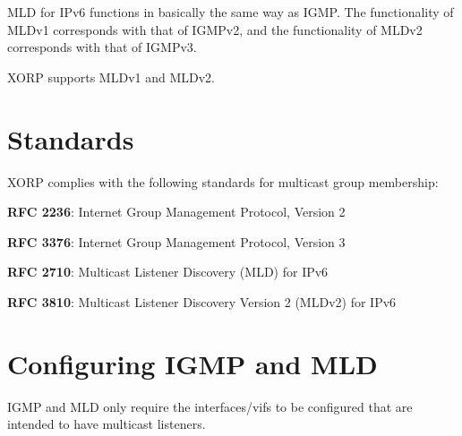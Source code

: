 MLD for IPv6 functions in basically the same way as IGMP.  The
functionality of MLDv1 corresponds with that of IGMPv2, and the
functionality of MLDv2 corresponds with that of IGMPv3.  

XORP supports MLDv1 and MLDv2.

\vfill\eject
\section{Standards}
XORP complies with the following standards for multicast group membership:

\begin{description}
  \item{\bf RFC 2236}: Internet Group Management Protocol, Version 2
  \item{\bf RFC 3376}: Internet Group Management Protocol, Version 3
  \item{\bf RFC 2710}: Multicast Listener Discovery (MLD) for IPv6
  \item{\bf RFC 3810}: Multicast Listener Discovery Version 2 (MLDv2) for IPv6
\end{description}

\section{Configuring IGMP and MLD}

IGMP and MLD only require the interfaces/vifs to be configured that
are intended to have multicast listeners.

